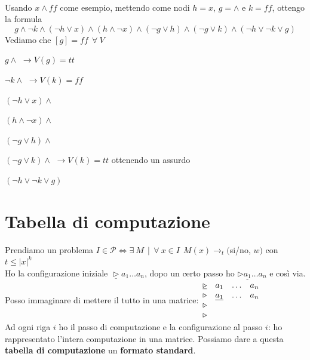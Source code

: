 \documentclass[10pt]{book}
\begin{document}
\paragraph{} Usando $x \wedge ff$ come esempio, mettendo come nodi $h = x$, $g = \wedge$ e $k = ff$, ottengo la formula $$g \wedge \neg k \wedge (\neg h \vee x) \wedge (h \wedge \neg x) \wedge(\neg g \vee h) \wedge (\neg g \vee k) \wedge (\neg h \vee \neg k \vee g)$$
 Vediamo che $[g] = ff\:\:\forall\:V$
\begin{list}{}{}
	\item $g \wedge$ $\longrightarrow V(g) = tt$ 
	\item $\neg k \wedge$ $\longrightarrow V(k) = ff$
	\item $(\neg h \vee x) \wedge$ 
	\item $(h \wedge \neg x) \wedge$
	\item $(\neg g \vee h) \wedge$
	\item $(\neg g \vee k) \wedge$ $\longrightarrow V(k) = tt$ ottenendo un assurdo
	\item $(\neg h \vee \neg k \vee g)$
\end{list}
\section{Tabella di computazione}
Prendiamo un problema $I \in \mathscr{P} \Leftrightarrow \exists\:M\:\:|\:\:\forall\:x \in I\:\:M(x)\longrightarrow_t ($si/no, $w)$ con $t \leq |x|^k$\\
Ho la configurazione iniziale $\underline{\triangleright}a_1\ldots a_n$, dopo un certo passo ho $\triangleright\underline{a_1}\ldots a_n$ e così via.\\
Posso immaginare di mettere il tutto in una matrice:$\begin{array}{c c c c}
\underline{\triangleright} &a_1&\ldots & a_n\\
\triangleright&\underline{a_1}&\ldots& a_n\\
\triangleright\\
\triangleright\\
\end{array}$\\
Ad ogni riga $i$ ho il passo di computazione e la configurazione al passo $i$: ho rappresentato l'intera computazione in una matrice. Possiamo dare a questa \textbf{tabella di computazione} un \textbf{formato standard}.
\end{document}
